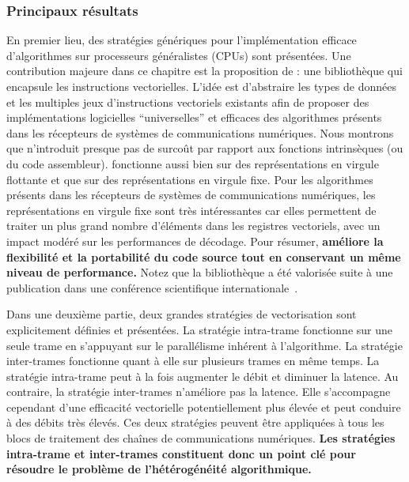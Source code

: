 \subsubsection*{Principaux résultats}

En premier lieu, des stratégies génériques pour l'implémentation efficace
d'algorithmes sur processeurs généralistes (CPUs) sont présentées. Une
contribution majeure dans ce chapitre est la proposition de \MIPP : une
bibliothèque qui encapsule les instructions vectorielles. L'idée est d'abstraire
les types de données et les multiples jeux d’instructions vectoriels existants
afin de proposer des implémentations logicielles ``universelles'' et efficaces
des algorithmes présents dans les récepteurs de systèmes de communications
numériques. Nous montrons que \MIPP n'introduit presque pas de surcoût par
rapport aux fonctions intrinsèques (ou du code assembleur). \MIPP fonctionne
aussi bien sur des représentations en virgule flottante et que sur des
représentations en virgule fixe. Pour les algorithmes présents dans les
récepteurs de systèmes de communications numériques, les représentations en
virgule fixe sont très intéressantes car elles permettent de traiter un plus
grand nombre d'éléments dans les registres vectoriels, avec un impact modéré sur
les performances de décodage. Pour résumer, \textbf{\MIPP améliore la
flexibilité et la portabilité du code source tout en conservant un même niveau
de performance.} Notez que la bibliothèque \MIPP a été valorisée suite à une
publication dans une conférence scientifique internationale~\cite{Cassagne2018}.

Dans une deuxième partie, deux grandes stratégies de vectorisation sont
explicitement définies et présentées. La stratégie intra-trame fonctionne
sur une seule trame en s'appuyant sur le parallélisme inhérent à l'algorithme.
La stratégie inter-trames fonctionne quant à elle sur plusieurs trames en même
temps. La stratégie intra-trame peut à la fois augmenter le débit et diminuer la
latence. Au contraire, la stratégie inter-trames n'améliore pas la latence. Elle
s'accompagne cependant d'une efficacité vectorielle potentiellement plus élevée
et peut conduire à des débits très élevés. Ces deux stratégies peuvent être
appliquées à tous les blocs de traitement des chaînes de communications
numériques. \textbf{Les stratégies intra-trame et inter-trames constituent donc
un point clé pour résoudre le problème de l'hétérogénéité algorithmique.}


